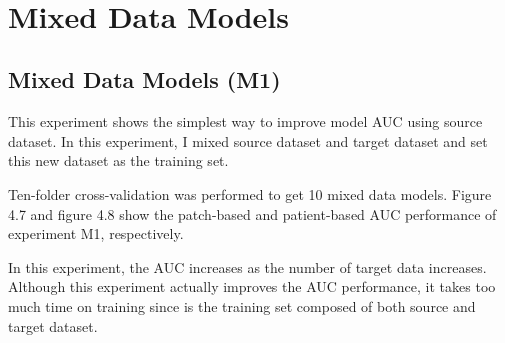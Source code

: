 ~\\
\section{Mixed Data Models}
\subsection{Mixed Data Models (M1)}
This experiment shows the simplest way to improve model AUC using source dataset. In this experiment, I mixed source dataset and target dataset and set this new dataset as the training set. 

Ten-folder cross-validation was performed to get 10 mixed data models. Figure 4.7 and figure 4.8 show the patch-based and patient-based AUC performance of experiment M1, respectively. 

In this experiment, the AUC increases as the number of target data increases. Although this experiment actually improves the AUC performance, it takes too much time on training since is the training set composed of both source and target dataset.

